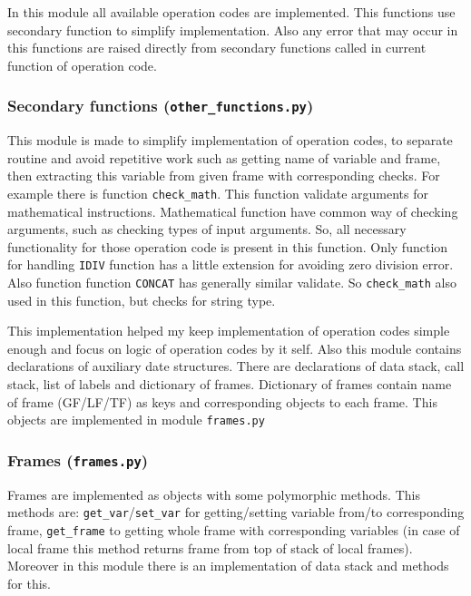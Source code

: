 \documentclass[10pt,a4paper]{article}
\begin{document}
In this module all available operation codes are implemented. This functions
use secondary function to simplify implementation. Also any error that may occur 
in this functions are raised directly from secondary functions called in current 
function of operation code.  

\subsubsection{Secondary functions (\texttt{other\_functions.py})}

This module is made to simplify implementation of operation codes, to separate 
routine and avoid repetitive work such as getting name of variable and frame, 
then extracting this variable from given frame with corresponding checks. For 
example there is function \texttt{check\_math}. This function validate arguments 
for mathematical instructions. Mathematical function have common way of checking 
arguments, such as checking types of input arguments. So, all necessary 
functionality for those operation code is present in this function. Only 
function for handling \texttt{IDIV} function has a little extension for avoiding 
zero division error. Also function function \texttt{CONCAT} has generally 
similar validate. So \texttt{check\_math} also used in this function, but checks 
for string type.

This implementation helped my keep implementation of operation codes simple enough 
and focus on logic of operation codes by it self. Also this module contains 
declarations of auxiliary  date structures. There are declarations of data stack, 
call stack, list of labels and dictionary of frames. Dictionary of frames 
contain name of frame (GF/LF/TF) as keys and corresponding  objects to each frame. 
This objects are implemented in module \texttt{frames.py}

\subsubsection{Frames (\texttt{frames.py})}

Frames are implemented as objects with some polymorphic methods. This methods are: 
\texttt{get\_var}/\texttt{set\_var} for getting/setting variable from/to 
corresponding frame, \texttt{get\_frame} to getting whole frame with corresponding 
variables (in case of local frame this method returns frame from top of stack of 
local frames). Moreover in this module there is an implementation of data stack 
and methods for this.
\end{document}

